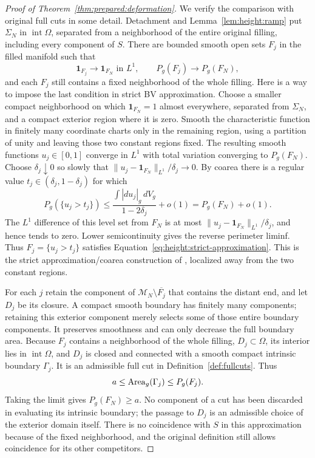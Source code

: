 \begin{proof}[Proof of Theorem~\ref{thm:prepared:deformation}]
We verify the comparison with original full cuts in some detail.
Detachment and Lemma~\ref{lem:height:ramp} put $\Sigma_N$ in
$\operatorname{int}\Omega$, separated from a neighborhood of the
entire original filling, including every component of $S$.  There are
bounded smooth open sets $F_j$ in the filled manifold such that
\begin{equation}\label{eq:height:strict-approximation}
 \mathbf1_{F_j}\longrightarrow\mathbf1_{F_N}\text{ in }L^1,
 \qquad P_g(F_j)\longrightarrow P_g(F_N),
\end{equation}
and each $F_j$ still contains a fixed neighborhood of the whole filling.
Here is a way to impose the last condition in strict BV approximation.
Choose a smaller compact neighborhood on which $\mathbf1_{F_N}=1$
almost everywhere, separated from $\Sigma_N$, and a compact exterior
region where it is zero.  Smooth the characteristic function in finitely
many coordinate charts only in the remaining region, using a partition
of unity and leaving those two constant regions fixed.  The resulting
smooth functions $u_j\in[0,1]$ converge in $L^1$ with total variation
converging to $P_g(F_N)$.  Choose $\delta_j\downarrow0$ so slowly that
$\|u_j-\mathbf1_{F_N}\|_{L^1}/\delta_j\to0$.  By coarea there is a
regular value $t_j\in(\delta_j,1-\delta_j)$ for which
\[
 P_g(\{u_j>t_j\})
 \le\frac{\int|du_j|_g\,dV_g}{1-2\delta_j}+o(1)
 =P_g(F_N)+o(1).
\]
The $L^1$ difference of this level set from $F_N$ is at most
$\|u_j-\mathbf1_{F_N}\|_{L^1}/\delta_j$, and hence tends to zero.
Lower semicontinuity gives the reverse perimeter liminf.  Thus
$F_j=\{u_j>t_j\}$ satisfies
Equation~\eqref{eq:height:strict-approximation}.  This is the strict
approximation/coarea construction of \cite{AFP}, localized away from
the two constant regions.

For each $j$ retain the component of $\mathcal M_N\setminus\overline{F_j}$
that contains the distant end, and let $D_j$ be its closure.  A compact
smooth boundary has finitely many components; retaining this exterior
component merely selects some of those entire boundary components.
It preserves smoothness and can only decrease the full boundary area.
Because $F_j$ contains a neighborhood of the whole filling,
$D_j\subset\Omega$, its interior lies in $\operatorname{int}\Omega$,
and $D_j$ is closed and connected with a smooth compact intrinsic
boundary $\Gamma_j$.  It is an admissible full cut in
Definition~\ref{def:fullcuts}.  Thus
\[
 a\le\operatorname{Area}_g(\Gamma_j)\le P_g(F_j).
\]
Taking the limit gives $P_g(F_N)\ge a$.  No component of a cut has
been discarded in evaluating its intrinsic boundary; the passage to
$D_j$ is an admissible choice of the exterior domain itself.  There is
no coincidence with $S$ in this approximation because of the fixed
neighborhood, and the original definition still allows coincidence for
its other competitors.


\end{proof}
